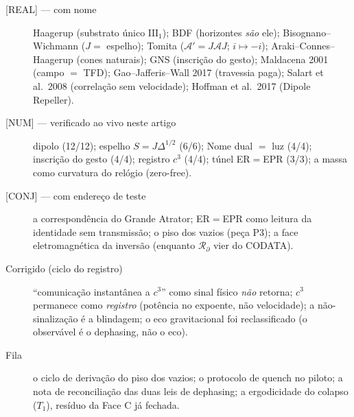 \documentclass[11pt]{article}
\theoremstyle{definition}\newtheorem{deriv}{Derivação}
\begin{document}
\begin{description}\item[\textsf{[REAL]} --- com nome] Haagerup (substrato único $\mathrm{III}_1$); BDF (horizontes \emph{são} ele); Bisognano--Wichmann ($J=$ espelho); Tomita ($\mathcal{A}'=J\mathcal{A}J$; $i\mapsto-i$); Araki--Connes--Haagerup (cones naturais); GNS (inscrição do gesto); Maldacena 2001 (campo $=$ TFD); Gao--Jafferis--Wall 2017 (travessia paga); Salart et al.\ 2008 (correlação sem velocidade); Hoffman et al.\ 2017 (Dipole Repeller).\item[\textsf{[NUM]} --- verificado ao vivo neste artigo] dipolo (12/12); espelho $S=J\Delta^{1/2}$ (6/6); Nome dual $=$ luz (4/4); inscrição do gesto (4/4); registro $c^3$ (4/4); túnel ER$=$EPR (3/3); a massa como curvatura do relógio (zero-free).\item[\textsf{[CONJ]} --- com endereço de teste] a correspondência do Grande Atrator; ER$=$EPR como leitura da identidade sem transmissão; o piso dos vazios (peça P3); a face eletromagnética da inversão (enquanto $\mathcal{R}_\partial$ vier do CODATA).\item[Corrigido (ciclo do registro)] ``comunicação instantânea a $c^3$'' como sinal físico \emph{não} retorna; $c^3$ permanece como \emph{registro} (potência no expoente, não velocidade); a não-sinalização é a blindagem; o eco gravitacional foi reclassificado (o observável é o dephasing, não o eco).\item[Fila] o ciclo de derivação do piso dos vazios; o protocolo de quench no piloto; a nota de reconciliação das duas leis de dephasing; a ergodicidade do colapso ($T_1$), resíduo da Face C já fechada.\end{description}
\end{document}
